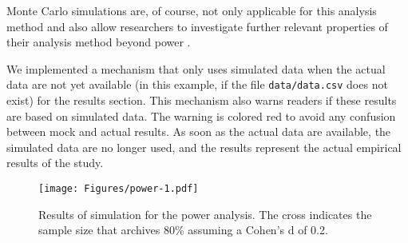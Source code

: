 \documentclass[psych,tutorial,accept,moreauthors,pdftex]{Definitions/mdpi}
\begin{document}
\begin{paracol}{2}
\switchcolumn




Monte Carlo simulations are, of course, not only applicable for this
analysis method and also allow researchers to investigate further
relevant properties of their analysis method beyond power
\citep{brandmaier2018precision, harrisonIntroductionMonteCarlo2010, raychaudhuriIntroductionMonteCarlo2008}.

We implemented a mechanism that only uses simulated data when the actual
data are not yet available (in this example, if the file
\texttt{data/data.csv} does not exist) for the results section. This
mechanism also warns readers if these results are based on simulated
data. The warning is colored red to avoid any confusion between mock and
actual results. As soon as the actual data are available, the simulated
data are no longer used, and the results represent the actual empirical
results of the study.


\begin{figure}[H]
\texttt{[image: Figures/power-1.pdf]}
\caption{Results of simulation for the power analysis. The
cross indicates the sample size that archives 80\% assuming a Cohen's d
of 0.2.}
\label{figure3}
\end{figure}



\vspace{+6pt}
\end{paracol}
\nointerlineskip
\end{document}
